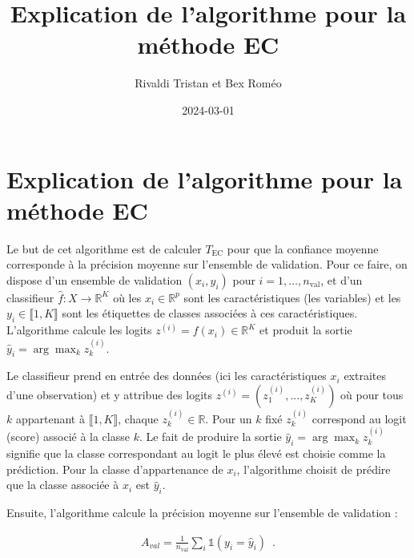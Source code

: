 \documentclass[
  letterpaper,
  DIV=11,
  numbers=noendperiod]{scrartcl}
\title{Explication de l'algorithme pour la méthode EC}
\author{Rivaldi Tristan et Bex Roméo}
\date{2024-03-01}
\begin{document}
\maketitle
\ifdefined\Shaded\renewenvironment{Shaded}{\begin{tcolorbox}[enhanced, borderline west={3pt}{0pt}{shadecolor}, boxrule=0pt, interior hidden, breakable, sharp corners, frame hidden]}{\end{tcolorbox}}\fi

\hypertarget{explication-de-lalgorithme-pour-la-muxe9thode-ec}{%
\section{Explication de l'algorithme pour la méthode
EC}\label{explication-de-lalgorithme-pour-la-muxe9thode-ec}}

Le but de cet algorithme est de calculer \(T_{\text{EC}}\) pour que la
confiance moyenne corresponde à la précision moyenne sur l'ensemble de
validation. Pour ce faire, on dispose d'un ensemble de validation
\((x_i, y_i)\) pour \(i = 1, \ldots, n_{\text{val}}\), et d'un
classifieur \(\hat{f} : X \rightarrow \mathbb{R}^K\) où les
\(x_i \in \mathbb{R}^p\) sont les caractéristiques (les variables) et
les \(y_i \in \llbracket 1, K \rrbracket\) sont les étiquettes de
classes associées à ces caractéristiques. L'algorithme calcule les
logits \(z^{(i)} = f(x_i) \in \mathbb{R}^K\) et produit la sortie
\(\hat{y}_i = \arg \max_k z_{k}^{(i)}\).

Le classifieur prend en entrée des données (ici les caractéristiques
\(x_i\) extraites d'une observation) et y attribue des logits
\(z^{(i)}=(z_{1}^{(i)},...,z_{K}^{(i)})\) où pour tous \(k\) appartenant
à \(\llbracket 1, K \rrbracket\), chaque \(z_{k}^{(i)} \in \mathbb{R}\).
Pour un \(k\) fixé \(z_{k}^{(i)}\) correspond au logit (score) associé à
la classe \(k\). Le fait de produire la sortie
\(\hat{y}_i = \arg \max_k z_{k}^{(i)}\) signifie que la classe
correspondant au logit le plus élevé est choisie comme la prédiction.
Pour la classe d'appartenance de \(x_i\), l'algorithme choisit de
prédire que la classe associée à \(x_i\) est \(\hat{y}_i\).

Ensuite, l'algorithme calcule la précision moyenne sur l'ensemble de
validation :

\begin{align*}
A_{val} = \frac{1}{n_{\text{val}}} \sum_{i} \mathds{1}(y_i = \hat{y}_i)  \enspace .
\end{align*}
\end{document}
